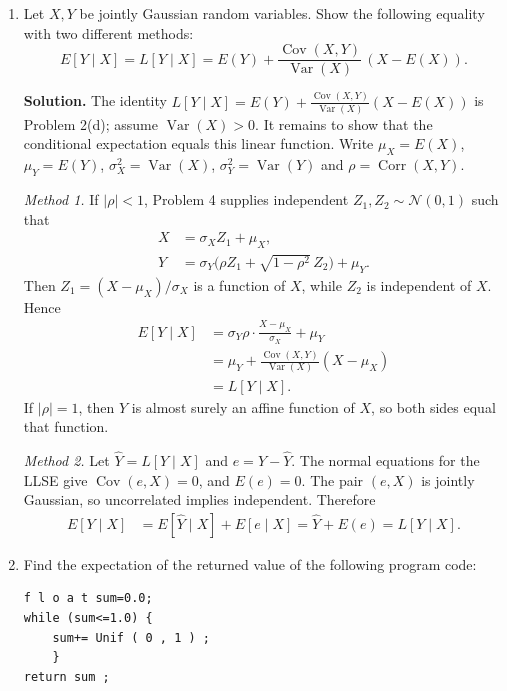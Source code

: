 \documentclass[11pt]{article}
\newcommand{\Var}{\operatorname{Var}}
\newcommand{\Cov}{\operatorname{Cov}}
\newcommand{\Corr}{\operatorname{Corr}}
\begin{document}
\begin{enumerate}[label=\arabic*., leftmargin=1.6em]
\newpage
\item Let $X,Y$ be jointly Gaussian random variables. Show the following equality with two
different methods:
\[
E[Y\mid X] = L[Y\mid X] = E(Y) + \frac{\Cov(X,Y)}{\Var(X)}\,(X-E(X)).
\]

\textbf{Solution.}
The identity \(L[Y\mid X]=E(Y)+\frac{\Cov(X,Y)}{\Var(X)}(X-E(X))\) is Problem 2(d); assume \(\Var(X)>0\). It remains to show that the conditional expectation equals this linear function. Write \(\mu_{X}=E(X)\), \(\mu_{Y}=E(Y)\), \(\sigma_{X}^{2}=\Var(X)\), \(\sigma_{Y}^{2}=\Var(Y)\) and \(\rho=\Corr(X,Y)\).

\textit{Method 1.}
If \(|\rho|<1\), Problem 4 supplies independent \(Z_{1},Z_{2}\sim\mathcal{N}(0,1)\) such that
\begin{align*}
X
&= \sigma_{X}Z_{1}+\mu_{X}, \\
Y
&= \sigma_{Y}\bigl(\rho Z_{1}+\sqrt{1-\rho^{2}}\,Z_{2}\bigr)+\mu_{Y}.
\end{align*}
Then \(Z_{1}=(X-\mu_{X})/\sigma_{X}\) is a function of \(X\), while \(Z_{2}\) is independent of \(X\). Hence
\begin{align*}
E[Y\mid X]
&= \sigma_{Y}\rho\cdot\frac{X-\mu_{X}}{\sigma_{X}}+\mu_{Y} \\
&= \mu_{Y}+\frac{\Cov(X,Y)}{\Var(X)}(X-\mu_{X}) \\
&= L[Y\mid X].
\end{align*}
If \(|\rho|=1\), then \(Y\) is almost surely an affine function of \(X\), so both sides equal that function.

\textit{Method 2.}
Let \(\widehat{Y}=L[Y\mid X]\) and \(e=Y-\widehat{Y}\). The normal equations for the LLSE give \(\Cov(e,X)=0\), and \(E(e)=0\). The pair \((e,X)\) is jointly Gaussian, so uncorrelated implies independent. Therefore
\begin{align*}
E[Y\mid X]
&= E[\widehat{Y}\mid X]+E[e\mid X]
= \widehat{Y}+E(e)
= L[Y\mid X].
\end{align*}

\newpage
\item Find the expectation of the returned value of the following program code:
\begin{verbatim}
f l o a t sum=0.0;
while (sum<=1.0) {
    sum+= Unif ( 0 , 1 ) ;
    }
return sum ;
\end{verbatim}


\end{enumerate}
\end{document}
